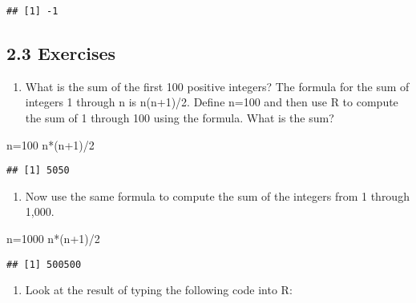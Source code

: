 \documentclass[
]{article}
\newenvironment{Shaded}{\begin{snugshade}}{\end{snugshade}}
\newcommand{\DecValTok}[1]{\textcolor[rgb]{0.00,0.00,0.81}{#1}}
\newcommand{\NormalTok}[1]{#1}
\newcommand{\OtherTok}[1]{\textcolor[rgb]{0.56,0.35,0.01}{#1}}
\newcommand{\SpecialCharTok}[1]{\textcolor[rgb]{0.00,0.00,0.00}{#1}}
\providecommand{\tightlist}{%
  \setlength{\itemsep}{0pt}\setlength{\parskip}{0pt}}
\begin{document}
\begin{verbatim}
## [1] -1
\end{verbatim}

\hypertarget{exercises}{%
\subsection{2.3 Exercises}\label{exercises}}

\begin{enumerate}
\def\labelenumi{\arabic{enumi}.}
\tightlist
\item
  What is the sum of the first 100 positive integers? The formula for
  the sum of integers 1 through n is n(n+1)/2. Define n=100 and then use
  R to compute the sum of 1 through 100 using the formula. What is the
  sum?
\end{enumerate}

\begin{Shaded}
\begin{Highlighting}[]
\NormalTok{n}\OtherTok{=}\DecValTok{100}
\NormalTok{n}\SpecialCharTok{*}\NormalTok{(n}\SpecialCharTok{+}\DecValTok{1}\NormalTok{)}\SpecialCharTok{/}\DecValTok{2}
\end{Highlighting}
\end{Shaded}

\begin{verbatim}
## [1] 5050
\end{verbatim}

\begin{enumerate}
\def\labelenumi{\arabic{enumi}.}
\setcounter{enumi}{1}
\tightlist
\item
  Now use the same formula to compute the sum of the integers from 1
  through 1,000.
\end{enumerate}

\begin{Shaded}
\begin{Highlighting}[]
\NormalTok{n}\OtherTok{=}\DecValTok{1000}
\NormalTok{n}\SpecialCharTok{*}\NormalTok{(n}\SpecialCharTok{+}\DecValTok{1}\NormalTok{)}\SpecialCharTok{/}\DecValTok{2}
\end{Highlighting}
\end{Shaded}

\begin{verbatim}
## [1] 500500
\end{verbatim}

\begin{enumerate}
\def\labelenumi{\arabic{enumi}.}
\setcounter{enumi}{2}
\tightlist
\item
  Look at the result of typing the following code into R:
\end{enumerate}
\end{document}
